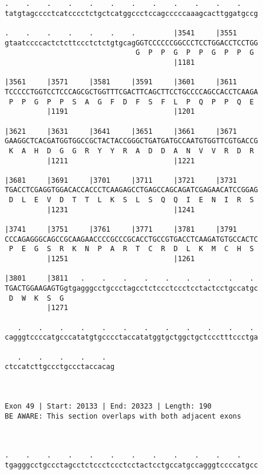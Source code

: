 \documentclass{article}
\begin{document}
\begin{Verbatim}
.    .    .    .    .    .    .    .    .    .    .    .    
tatgtagcccctcatcccctctgctcatggccctccagcccccaaagcacttggatgccg
                                                            
.    .    .    .    .    .    .         |3541     |3551     
gtaatccccactctcttccctctctgtgcagGGTCCCCCCGGCCCTCCTGGACCTCCTGG
                               G  P  P  G  P  P  G  P  P  G 
                                        |1181               
  
|3561     |3571     |3581     |3591     |3601     |3611     
TCCCCCTGGTCCTCCCAGCGCTGGTTTCGACTTCAGCTTCCTGCCCCAGCCACCTCAAGA
 P  P  G  P  P  S  A  G  F  D  F  S  F  L  P  Q  P  P  Q  E 
          |1191                         |1201               
  
|3621     |3631     |3641     |3651     |3661     |3671     
GAAGGCTCACGATGGTGGCCGCTACTACCGGGCTGATGATGCCAATGTGGTTCGTGACCG
 K  A  H  D  G  G  R  Y  Y  R  A  D  D  A  N  V  V  R  D  R 
          |1211                         |1221               
  
|3681     |3691     |3701     |3711     |3721     |3731     
TGACCTCGAGGTGGACACCACCCTCAAGAGCCTGAGCCAGCAGATCGAGAACATCCGGAG
 D  L  E  V  D  T  T  L  K  S  L  S  Q  Q  I  E  N  I  R  S 
          |1231                         |1241               
  
|3741     |3751     |3761     |3771     |3781     |3791     
CCCAGAGGGCAGCCGCAAGAACCCCGCCCGCACCTGCCGTGACCTCAAGATGTGCCACTC
 P  E  G  S  R  K  N  P  A  R  T  C  R  D  L  K  M  C  H  S 
          |1251                         |1261               
  
|3801     |3811   .    .    .    .    .    .    .    .    . 
TGACTGGAAGAGTGgtgagggcctgccctagcctctccctccctcctactcctgccatgc
 D  W  K  S  G                                              
          |1271                                             
  
   .    .    .    .    .    .    .    .    .    .    .    . 
cagggtccccatgcccatatgtgcccctaccatatggtgctggctgctccctttccctga
                                                            
   .    .    .    .    .  
ctccatcttgccctgccctaccacag
                          
                          
 
Exon 49 | Start: 20133 | End: 20323 | Length: 190
BE AWARE: This section overlaps with both adjacent exons



.    .    .    .    .    .    .    .    .    .    .    .    
tgagggcctgccctagcctctccctccctcctactcctgccatgccagggtccccatgcc
                                                            

\end{Verbatim}
\end{document}
